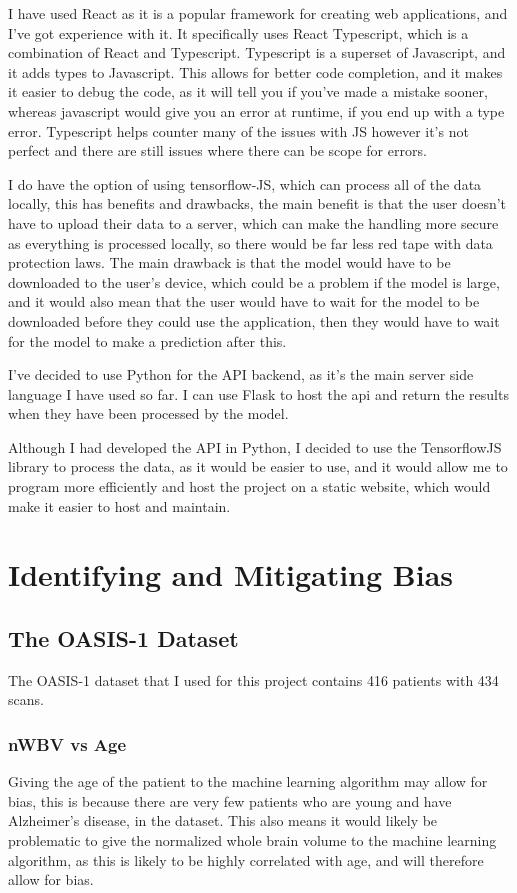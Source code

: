 \documentclass[]{final_report}
\begin{document}
I have used React\cite{React} as it is a popular framework for creating web applications, and I've got experience with it. It specifically uses React Typescript, which is a combination of React and Typescript. Typescript is a superset of Javascript, and it adds types to Javascript.
This allows for better code completion, and it makes it easier to debug the code, as it will tell you if you've made a mistake sooner, whereas javascript would give you an error at runtime, if you end up with a type error. Typescript helps counter many of the issues with JS however it's not perfect and there are still issues where there can be scope for errors.

I do have the option of using tensorflow-JS, which can process all of the data locally, this has benefits and drawbacks, the main benefit is that the user doesn't have to upload their data to a server, which can make the handling more secure as everything is processed locally, so there would be far less red tape with data protection laws. The main drawback is that the model would have to be downloaded to the user's device, which could be a problem if the model is large, and it would also mean that the user would have to wait for the model to be downloaded before they could use the application, then they would have to wait for the model to make a prediction after this.

I've decided to use Python for the API backend, as it's the main server side language I have used so far. I can use Flask to host the api and return the results when they have been processed by the model.

Although I had developed the API in Python, I decided to use the TensorflowJS library to process the data, as it would be easier to use, and it would allow me to program more efficiently and host the project on a static website, which would make it easier to host and maintain.

\chapter{Identifying and Mitigating Bias}


\section{The OASIS-1 Dataset}
The OASIS-1 dataset\cite{OASIS} that I used for this project contains 416 patients with 434 scans.

\subsection{nWBV vs Age}
Giving the age of the patient to the machine learning algorithm may allow for bias, this is because there are very few patients who are young and have Alzheimer's disease, in the dataset.
This also means it would likely be problematic to give the normalized whole brain volume to the machine learning algorithm, as this is likely to be highly correlated with age, and will therefore allow for bias.
\end{document}
